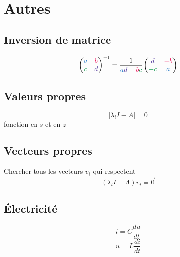 \documentclass[resume]{subfiles}
\begin{document}
\section{Autres}
\subsection{Inversion de matrice}
$$\begin{pmatrix}
\textcolor{RoyalBlue}{a} & \textcolor{OrangeRed}{b}\\
\textcolor{ForestGreen}{c} & \textcolor{Violet}{d}
\end{pmatrix}^{-1}=\frac{1}{\textcolor{RoyalBlue}{a}\textcolor{Violet}{d}-\textcolor{OrangeRed}{b}\textcolor{ForestGreen}{c}}\begin{pmatrix}
\textcolor{Violet}{d} & \textcolor{OrangeRed}{-b}\\
\textcolor{ForestGreen}{-c} & \textcolor{RoyalBlue}{a}
\end{pmatrix}$$
\subsection{Valeurs propres}
$$\left|\lambda_i I - A\right|=0$$
fonction en $s$ et en $z$
\subsection{Vecteurs propres}
Chercher tous les vecteurs $v_i$ qui respectent
$$(\lambda_i I - A)v_i=\vec{0}$$
\subsection{Électricité}
$$i=C\frac{du}{dt}$$
$$u=L\frac{di}{dt}$$
\end{document}
